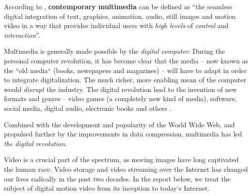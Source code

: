 According to \cite{ucalgary-hom}, \textbf{contemporary multimedia} can be defined as ``the seamless digital integration of text, graphics, animation, audio, still images and motion video in a way that provides individual users with \emph{high levels} of \emph{control} and \emph{interaction}''.

Multimedia is generally made possible by the \emph{digital computer}.
During the personal computer revolution, it has become clear that the media -- now known as the ``old media`` (books, newspapers and magazines) -- will have to adapt in order to integrate digitalization.
The much richer, more enabling mean of the computer would \emph{disrupt} the industry.
The digital revolution lead to the invention of new formats and genres -- video games (a completely new kind of media), software, social media, digital audio, electronic books and others \cite{wiki:Digital_media}.

Combined with the development and popularity of the World Wide Web, and propulsed further by the improvements in data compression, multimedia has led \emph{the digital revolution}.

Video is a crucial part of the spectrum, as moving images have long captivated the human race.
Video storage and video streaming over the Internet has changed our lives radically in the past two decades.
In the report below, we treat the subject of digital motion video from its inception to today's Internet.